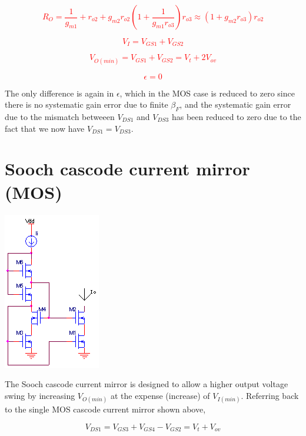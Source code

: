\textcolor{red}{
\begin{equation}
R_{O} = \frac{1}{g_{m1}}+r_{o2}+g_{m2}r_{o2}\left(1+\frac{1}{g_{m1}r_{o3}}\right)r_{o3} \approx (1+g_{m2}r_{o3})r_{o2}
\end{equation}
}

\textcolor{red}{
\begin{equation}
V_{I} = V_{GS1}+V_{GS2}
\end{equation}
}

\textcolor{red}{
\begin{equation}
V_{O(min)} = V_{GS1}+V_{GS2} = V_{t}+2V_{ov}
\end{equation}
}

\textcolor{red}{
\begin{equation}
\epsilon = 0
\end{equation}
}

The only difference is again in $\epsilon$, which in the MOS case is reduced to zero since there is no systematic gain error due to finite $\beta_{F}$, and the systematic gain error due to the mismatch betweeen $V_{DS1}$ and $V_{DS3}$ has been reduced to zero due to the fact that we now have $V_{DS1} = V_{DS3}$.

\section{Sooch cascode current mirror (MOS)}
\begin{center}
	\includegraphics{schematics/soochcascodecurrentmirror.PNG}
\end{center}
The Sooch cascode current mirror is designed to allow a higher output voltage swing by increasing $V_{O(min)}$ at the expense (increase) of $V_{I(min)}$.
Referring back to the single MOS cascode current mirror shown above,

\begin{equation}
V_{DS1} = V_{GS3} + V_{GS4} - V_{GS2} = V_{t} + V_{ov}
\end{equation}


